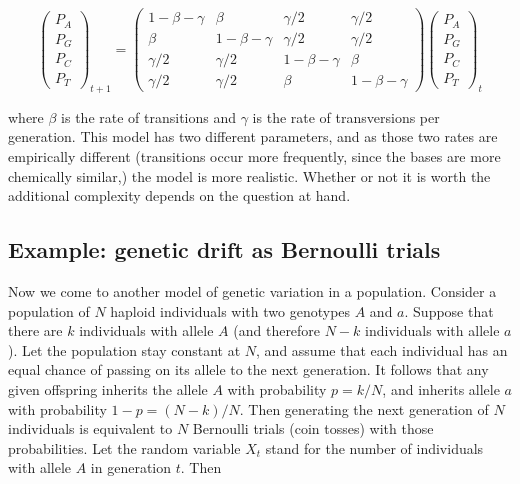 \documentclass[
  letterpaper,
  DIV=11,
  numbers=noendperiod]{scrreprt}
\begin{document}
\[   
\left(\begin{array}{c} P_A \\ P_G \\ P_C \\ P_T \end{array}\right)_{t+1}  = \left(\begin{array}{cccc}1-\beta-\gamma & \beta & \gamma/2 &  \gamma/2 \\ \beta  & 1-\beta-\gamma & \gamma/2 & \gamma/2 \\ \gamma/2 & \gamma/2 & 1-\beta-\gamma& \beta  \\ \gamma/2 &\gamma/2 & \beta  & 1-\beta-\gamma \end{array}\right) \left(\begin{array}{c} P_A \\ P_G \\ P_C \\ P_T \end{array}\right)_t 
\]

where \(\beta\) is the rate of transitions and \(\gamma\) is the rate of
transversions per generation. This model has two different parameters,
and as those two rates are empirically different (transitions occur more
frequently, since the bases are more chemically similar,) the model is
more realistic. Whether or not it is worth the additional complexity
depends on the question at hand.

\subsection{Example: genetic drift as Bernoulli
trials}\label{example-genetic-drift-as-bernoulli-trials}

Now we come to another model of genetic variation in a population.
Consider a population of \(N\) haploid individuals with two genotypes
\(A\) and \(a\). Suppose that there are \(k\) individuals with allele
\(A\) (and therefore \(N-k\) individuals with allele \(a\)). Let the
population stay constant at \(N\), and assume that each individual has
an equal chance of passing on its allele to the next generation. It
follows that any given offspring inherits the allele \(A\) with
probability \(p = k/N\), and inherits allele \(a\) with probability
\(1-p = (N-k)/N\). Then generating the next generation of \(N\)
individuals is equivalent to \(N\) Bernoulli trials (coin tosses) with
those probabilities. Let the random variable \(X_t\) stand for the
number of individuals with allele \(A\) in generation \(t\). Then
\end{document}
